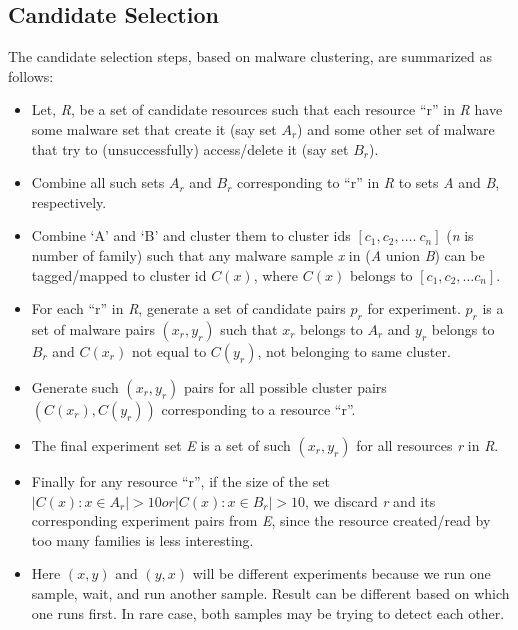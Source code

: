 \subsection{Candidate Selection}
\label{sub:Candidate Selection}
The candidate selection steps, based on malware clustering, are summarized as follows:
\begin{itemize}
  \item Let, \emph{R}, be a set of candidate resources such that each resource ``r'' in \emph{R} have some malware set that create it (say set $A_r$) and some other set of malware that try to (unsuccessfully) access/delete it (say set $B_r$).
  \item Combine all such sets $A_r$ and $B_r$ corresponding to ``r'' in \emph{R} to sets \emph{A} and \emph{B}, respectively.
  \item Combine `A' and `B' and cluster them to cluster ids $[c_1,c_2,\ldots.\ c_n]$ (\emph{n} is number of family) such that any malware sample \emph{x} in (\emph{A} union \emph{B}) can be tagged/mapped to cluster id $C(x)$, where $C(x)$ belongs to $[c_1, c_2, \ldots c_n]$.
  \item For each ``r'' in \emph{R}, generate a set of candidate pairs $p_r$ for experiment. $p_r$ is a set of malware pairs $(x_r, y_r)$ such that $x_r$ belongs to $A_r$ and $y_r$ belongs to $B_r$ and $C(x_r)$ not equal to $C(y_r)$, not belonging to same cluster.
  \item Generate such $(x_r, y_r)$ pairs for all possible cluster pairs $(C(x_r), C(y_r))$ corresponding to a resource ``r''.
  \item The final experiment set \emph{E} is a set of such $(x_r, y_r)$ for all resources \emph{r} in \emph{R}.
  \item Finally for any resource ``r'', if the size of the set $| C(x) : x \in A_r | > 10 or  | C(x) : x \in B_r | > 10$, we discard \emph{r} and its corresponding experiment pairs from \emph{E}, since the resource created/read by too many families is less interesting.
  \item Here $(x,y)$ and $(y,x)$ will be different experiments because we run one sample, wait, and run another sample. Result can be different based on which one runs first. In rare case, both samples may be trying to detect each other.
\end{itemize}

